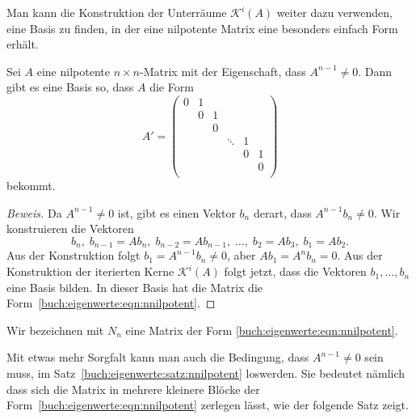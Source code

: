 Man kann die Konstruktion der Unterräume $\mathcal{K}^i(A)$ weiter
dazu verwenden, eine Basis zu finden, in der eine nilpotente Matrix
eine besonders einfach Form erhält.

\begin{satz}
\label{buch:eigenwerte:satz:nnilpotent}
Sei $A$ eine nilpotente $n\times n$-Matrix mit der Eigenschaft, dass
$A^{n-1}\ne 0$.
Dann gibt es eine Basis so, dass $A$ die Form
\begin{equation}
A'
=
\begin{pmatrix}
0&1& &      & & \\
 &0&1&      & & \\
 & &0&      & & \\
 & & &\ddots&1& \\
 & & &      &0&1\\
 & & &      & &0\\
\end{pmatrix}
\label{buch:eigenwerte:eqn:nnilpotent}
\end{equation}
bekommt.
\end{satz}

\begin{proof}[Beweis]
Da $A^{n-1}\ne 0$ ist, gibt es einen Vektor $b_n$ derart, dass $A^{n-1}b_n\ne0$.
Wir konstruieren die Vektoren
\[
b_n,\;
b_{n-1}=Ab_n,\;
b_{n-2}=Ab_{n-1},\;
\dots,\;
b_2=Ab_3,\;
b_1=Ab_2.
\]
Aus der Konstruktion folgt $b_1=A^{n-1}b_n\ne 0$, aber $Ab_1=A^nb_n=0$.
Aus der Konstruktion der iterierten Kerne $\mathcal{K}^i(A)$ folgt jetzt,
dass die Vektoren $b_1,\dots,b_n$ eine Basis bilden.
In dieser Basis hat die Matrix die Form~\ref{buch:eigenwerte:eqn:nnilpotent}.
\end{proof}

\begin{definition}
Wir bezeichnen mit $N_n$ eine Matrix der Form
\eqref{buch:eigenwerte:eqn:nnilpotent}.
\end{definition}

Mit etwas mehr Sorgfalt kann man auch die Bedingung, dass $A^{n-1}\ne 0$
sein muss, im Satz~\ref{buch:eigenwerte:satz:nnilpotent} loswerden.
Sie bedeutet nämlich dass sich die Matrix in mehrere kleinere Blöcke
der Form~\eqref{buch:eigenwerte:eqn:nnilpotent} zerlegen lässt, wie
der folgende Satz zeigt.

